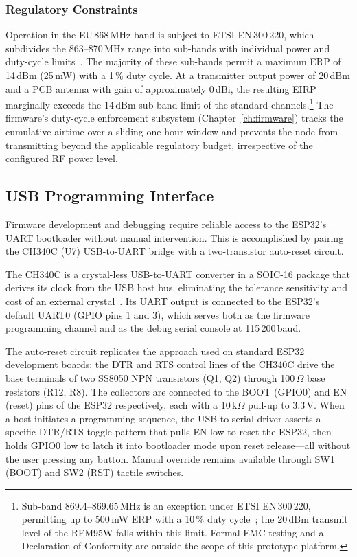 \documentclass[english,bachelor]{tfgitic}[2026/01/22]
\begin{document}
\subsubsection{Regulatory Constraints}
\label{subsec:hw_regulatory}

Operation in the EU\,868\,MHz band is subject to ETSI EN\,300\,220, which
subdivides the 863--870\,MHz range into sub-bands with individual power and
duty-cycle limits~\cite{etsi2020en300220, adelantado2017limits}. The majority of
these sub-bands permit a maximum ERP of 14\,dBm (25\,mW) with a 1\,\% duty cycle.
At a transmitter output power of 20\,dBm and a PCB antenna with gain of
approximately 0\,dBi, the resulting EIRP marginally exceeds the 14\,dBm sub-band
limit of the standard channels.\footnote{Sub-band 869.4--869.65\,MHz is an
exception under ETSI EN\,300\,220, permitting up to 500\,mW ERP with a 10\,\%
duty cycle~\cite{etsi2020en300220}; the 20\,dBm transmit level of the RFM95W
falls within this limit. Formal EMC testing and a Declaration of Conformity are
outside the scope of this prototype platform.} The firmware's duty-cycle enforcement
subsystem (Chapter~\ref{ch:firmware}) tracks the cumulative airtime over a sliding
one-hour window and prevents the node from transmitting beyond the applicable
regulatory budget, irrespective of the configured RF power level.


\subsection{USB Programming Interface}
\label{sec:hw_usb}


Firmware development and debugging require reliable access to the ESP32's UART
bootloader without manual intervention. This is accomplished by pairing the CH340C
(U7) USB-to-UART bridge with a two-transistor auto-reset circuit.

The CH340C is a crystal-less USB-to-UART converter in a SOIC-16 package that
derives its clock from the USB host bus, eliminating the tolerance sensitivity and
cost of an external crystal~\cite{ch340c2023}. Its UART output is connected to the
ESP32's default UART0 (GPIO pins 1 and 3), which serves both as the firmware
programming channel and as the debug serial console at 115\,200\,baud.

The auto-reset circuit replicates the approach used on standard ESP32 development
boards: the DTR and RTS control lines of the CH340C drive the base terminals of two
SS8050 NPN transistors (Q1, Q2) through 100\,$\Omega$ base resistors (R12, R8). The
collectors are connected to the BOOT (GPIO0) and EN (reset) pins of the ESP32
respectively, each with a 10\,k$\Omega$ pull-up to 3.3\,V. When a host initiates a
programming sequence, the USB-to-serial driver asserts a specific DTR/RTS toggle
pattern that pulls EN low to reset the ESP32, then holds GPIO0 low to latch it into
bootloader mode upon reset release---all without the user pressing any button.
Manual override remains available through SW1 (BOOT) and SW2 (RST) tactile switches.
\end{document}
